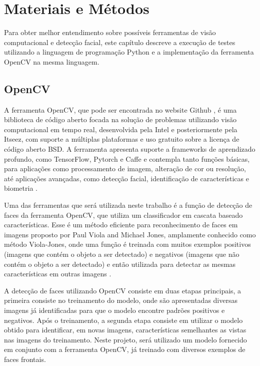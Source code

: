 \chapter{Materiais e Métodos}\label{cap:ferramentas}

Para obter melhor entendimento sobre possíveis ferramentas de visão computacional e detecção facial, este capítulo descreve a execução de testes utilizando a linguagem de programação Python e a implementação da ferramenta OpenCV na mesma linguagem.

\section{OpenCV}

A ferramenta OpenCV, que pode ser encontrada no website Github \cite{itseez2015opencv}, é uma biblioteca de código aberto focada na solução de problemas utilizando visão computacional em tempo real, desenvolvida pela Intel e posteriormente pela Itseez, com suporte a múltiplas plataformas e uso gratuito sobre a licença de código aberto BSD. A ferramenta apresenta suporte a frameworks de aprendizado profundo, como TensorFlow, Pytorch e Caffe e contempla tanto funções básicas, para aplicações como processamento de imagem, alteração de cor ou resolução, até aplicações avançadas, como detecção facial, identificação de características e biometria \cite{wiki:OpenCV}.

Uma das ferramentas que será utilizada neste trabalho é a função de detecção de faces da ferramenta OpenCV, que utiliza um classificador em cascata baseado características. Esse é um método eficiente para reconhecimento de faces em imagens proposto por Paul Viola and Michael Jones, amplamente conhecido como método Viola-Jones, onde uma função é treinada com muitos exemplos positivos (imagens que contém o objeto a ser detectado) e negativos (imagens que não contém o objeto a ser detectado) e então utilizada para detectar as mesmas características em outras imagens \cite{itseez2014theopencv}.

A detecção de faces utilizando OpenCV consiste em duas etapas principais, a primeira consiste no treinamento do modelo, onde são apresentadas diversas imagens já identificadas para que o modelo encontre padrões positivos e negativos. Após o treinamento, a segunda etapa consiste em utilizar o modelo obtido para identificar, em novas imagens, características semelhantes as vistas nas imagens do treinamento. Neste projeto, será utilizado um modelo fornecido em conjunto com a ferramenta OpenCV, já treinado com diversos exemplos de faces frontais.

